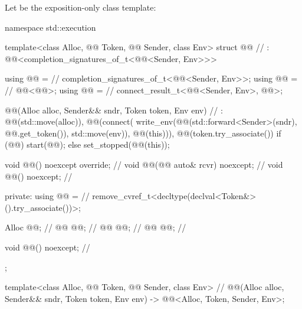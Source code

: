\pnum
Let  be the exposition-only class template:

%
\begin{codeblock}
namespace std::execution {
  template<class Alloc, @@ Token, @@ Sender, class Env>
  struct @@                                                 // \expos
    : @@<completion_signatures_of_t<@@<Sender, Env>>> {
    using @@ =                                                          // \expos
      completion_signatures_of_t<@@<Sender, Env>>;
    using @@ =                                                      // \expos
      @@<@@>;
    using @@ =                                                            // \expos
      connect_result_t<@@<Sender, Env>, @@>;

    @@(Alloc alloc, Sender&& sndr, Token token, Env env)    // \expos
      : @@(std::move(alloc)),
        @@(connect(
          write_env(@@(std::forward<Sender>(sndr), @@.get_token()), std::move(env)),
          @@(this))),
        @@(token.try_associate()) {
          if (@@)
            start(@@);
          else
            set_stopped(@@(this));
        }

    void @@() noexcept override;                                      // \expos
    void @@(@@ auto& rcvr) noexcept;                             // \expos
    void @@() noexcept;                                                // \expos

  private:
    using @@ =                                                         // \expos
      remove_cvref_t<decltype(declval<Token&>().try_associate())>;

    Alloc @@;                                                            // \expos
    @@ @@;                                                      // \expos
    @@ @@;                                                                // \expos
    @@ @@;                                                          // \expos

    void @@() noexcept;                                                // \expos
  };

  template<class Alloc, @@ Token, @@ Sender, class Env>        // \expos
    @@(Alloc alloc, Sender&& sndr, Token token, Env env)
      -> @@<Alloc, Token, Sender, Env>;
}
\end{codeblock}

